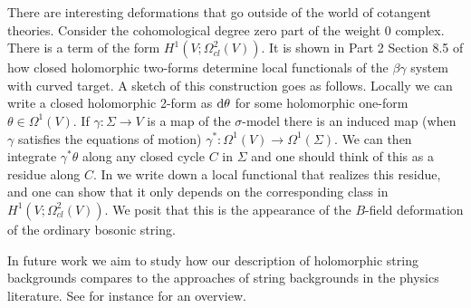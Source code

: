 There are interesting deformations that go outside of the world of cotangent theories. 
Consider the cohomological degree zero part of the weight 0 complex. 
There is a term of the form $H^1(V ; \Omega^2_{cl}(V))$.
It is shown in Part 2 Section 8.5 of \cite{GGW} how closed holomorphic two-forms determine local functionals of the $\beta\gamma$ system with curved target. 
A sketch of this construction goes as follows.
Locally we can write a closed holomorphic 2-form as ${\rm d} \theta$ for some holomorphic one-form $\theta \in \Omega^1(V)$. 
If $\gamma : \Sigma \to V$ is a map of the $\sigma$-model there is an induced map (when $\gamma$ satisfies the equations of motion) $\gamma^* : \Omega^1(V) \to \Omega^1(\Sigma)$. 
We can then integrate $\gamma^* \theta$ along any closed cycle $C$ in $\Sigma$ and one should think of this as a residue along $C$. 
In \cite{GGW} we write down a local functional that realizes this residue, and one can show that it only depends on the corresponding class in $H^1(V ; \Omega^2_{cl}(V))$. 
We posit that this is the appearance of the $B$-field deformation of the ordinary bosonic string. 

In future work we aim to study how our description of holomorphic string backgrounds compares to the approaches of string backgrounds in the physics literature. 
See for instance \cite{CFMP} for an overview.


